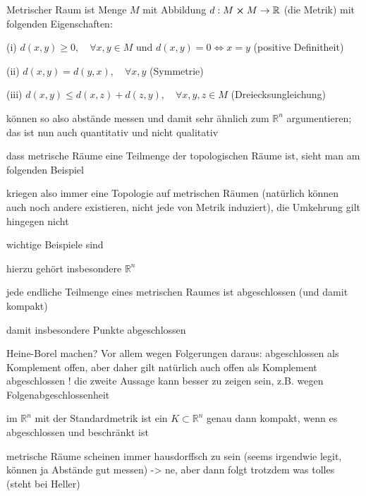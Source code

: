\documentclass[../H_Analysis_main.tex]{subfiles}
\begin{document}
\begin{defi}[Metrik]
Metrischer Raum ist Menge $M$ mit Abbildung $d: M \cross M \rightarrow \mathbb{R}$ (die Metrik) mit folgenden Eigenschaften:

(i) $d(x, y) \geq 0, \quad \forall x, y \in M$ und $d(x, y) = 0 \Leftrightarrow x = y$ (positive Definitheit)

(ii) $d(x, y) = d(y, x), \quad \forall x, y$ (Symmetrie)

(iii) $d(x, y) \leq d(x, z) + d(z, y), \quad \forall x, y, z \in M$ (Dreiecksungleichung)
\end{defi}

können so also abstände messen und damit sehr ähnlich zum $\mathbb{R}^n$ argumentieren; das ist nun auch quantitativ und nicht qualitativ


dass metrische Räume eine Teilmenge der topologischen Räume ist, sieht man am folgenden Beispiel

\begin{bsp}[Abstandstopologie]
kriegen also immer eine Topologie auf metrischen Räumen (natürlich können auch noch andere existieren, nicht jede von Metrik induziert), die Umkehrung gilt hingegen nicht
\end{bsp}

wichtige Beispiele sind

\begin{bsp}
hierzu gehört insbesondere $\mathbb{R}^n$
\end{bsp}


\begin{satz}
jede endliche Teilmenge eines metrischen Raumes ist abgeschlossen (und damit kompakt)
\end{satz}
damit insbesondere Punkte abgeschlossen

Heine-Borel machen? Vor allem wegen Folgerungen daraus: abgeschlossen als Komplement offen, aber daher gilt natürlich auch offen als Komplement abgeschlossen ! die zweite Aussage kann besser zu zeigen sein, z.B. wegen Folgenabgeschlossenheit

\begin{satz}
im $\mathbb{R}^n$ mit der Standardmetrik ist ein $K \subset \mathbb{R}^n$ genau dann kompakt, wenn es abgeschlossen und beschränkt ist
\end{satz}

metrische Räume scheinen immer hausdorffsch zu sein (seems irgendwie legit, können ja Abstände gut messen) -> ne, aber dann folgt trotzdem was tolles (steht bei Heller)
\end{document}
